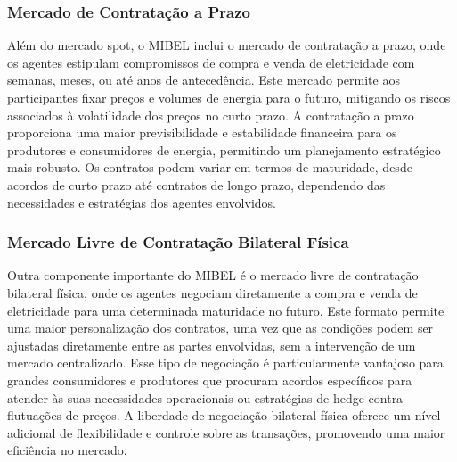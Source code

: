 \subsubsection{Mercado de Contratação a Prazo \label{se:mercado_prazo}}
Além do mercado spot, o \gls{MIBEL} inclui o mercado de contratação a prazo, onde os agentes estipulam compromissos de compra e venda de eletricidade com semanas, meses, ou até anos de antecedência. Este mercado permite aos participantes fixar preços e volumes de energia para o futuro, mitigando os riscos associados à volatilidade dos preços no curto prazo. A contratação a prazo proporciona uma maior previsibilidade e estabilidade financeira para os produtores e consumidores de energia, permitindo um planejamento estratégico mais robusto. Os contratos podem variar em termos de maturidade, desde acordos de curto prazo até contratos de longo prazo, dependendo das necessidades e estratégias dos agentes envolvidos.\\


\subsubsection{Mercado Livre de Contratação Bilateral Física \label{se:mercado_bilateral}}
Outra componente importante do \gls{MIBEL} é o mercado livre de contratação bilateral física, onde os agentes negociam diretamente a compra e venda de eletricidade para uma determinada maturidade no futuro. Este formato permite uma maior personalização dos contratos, uma vez que as condições podem ser ajustadas diretamente entre as partes envolvidas, sem a intervenção de um mercado centralizado. Esse tipo de negociação é particularmente vantajoso para grandes consumidores e produtores que procuram acordos específicos para atender às suas necessidades operacionais ou estratégias de hedge contra flutuações de preços. A liberdade de negociação bilateral física oferece um nível adicional de flexibilidade e controle sobre as transações, promovendo uma maior eficiência no mercado.\\

